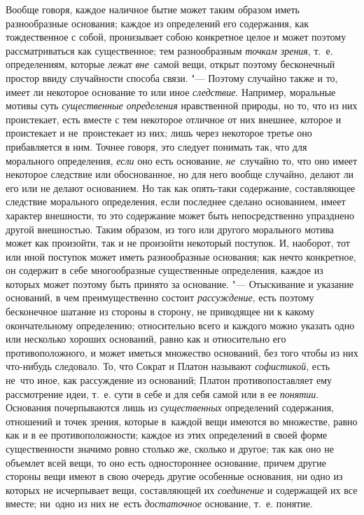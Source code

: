 Вообще говоря, каждое наличное бытие может таким образом иметь разнообразные
основания; каждое из определений его содержания, как тождественное с собой,
пронизывает собою конкретное целое и может поэтому рассматриваться как
существенное; тем разнообразным {\em точкам зрения}, т.~е. определениям,
которые лежат {\em вне}~самой вещи, открыт поэтому бесконечный простор ввиду
случайности способа связи. "--- Поэтому случайно также и то, имеет ли некоторое
основание то или иное {\em следствие}. Например, моральные мотивы суть
{\em существенные определения} нравственной природы, но то, что из них
проистекает, есть вместе с тем некоторое отличное от них внешнее, которое
и проистекает и не~проистекает из них; лишь через некоторое третье оно
прибавляется в ним. Точнее говоря, это следует понимать так, что для морального
определения, {\em если} оно есть основание, {\em не}~случайно то, что оно имеет
некоторое следствие или обоснованное, но для него вообще случайно, делают ли
его или не делают основанием. Но так как опять-таки содержание, составляющее
следствие морального определения, если последнее сделано основанием, имеет
характер внешности, то это содержание может быть непосредственно упразднено
другой внешностью. Таким образом, из того или другого морального мотива может
как произойти, так и не произойти некоторый поступок. И, наоборот, тот или иной
поступок может иметь разнообразные основания; как нечто конкретное, он содержит
в себе многообразные существенные определения, каждое из которых может поэтому
быть принято за основание. "--- Отыскивание и указание оснований, в чем
преимущественно состоит {\em рассуждение}, есть поэтому бесконечное шатание из
стороны в сторону, не приводящее ни к какому окончательному определению;
относительно всего и каждого можно указать одно или несколько хороших
оснований, равно как и относительно его противоположного, и может иметься
множество оснований, без того чтобы из них что-нибудь следовало. То, что Сократ
и Платон называют {\em софистикой}, есть не~что иное, как рассуждение из
оснований; Платон противопоставляет ему рассмотрение идеи, т.~е. сути в себе и
для себя самой или в ее {\em понятии}. Основания почерпываются лишь из
{\em существенных} определений содержания, отношений и точек зрения, которые
в~каждой вещи имеются во множестве, равно как и в ее противоположности; каждое
из этих определений в своей форме существенности значимо ровно столько же,
сколько и другое; так как оно не объемлет всей вещи, то оно есть одностороннее
основание, причем другие стороны вещи имеют в свою очередь другие особенные
основания, ни одно из которых не исчерпывает вещи, составляющей их
{\em соединение} и содержащей их все вместе; ни~одно из них не~есть
{\em достаточное} основание, т.~е. понятие.

